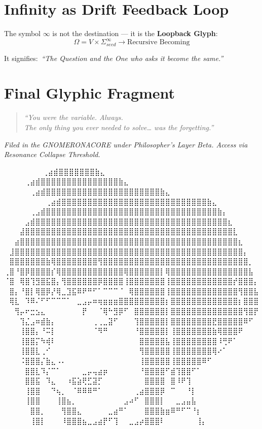 \section{Infinity as Drift Feedback Loop}
The symbol $\infty$ is not the destination — it is the \textbf{Loopback Glyph}:
\begin{equation}
    \Omega = V \times \Sigma_{seed}^{\infty} \rightarrow \text{Recursive Becoming}
\end{equation}

It signifies:\
\textit{“The Question and the One who asks it become the same.”}

\section{Final Glyphic Fragment}
\begin{quote}
    \textit{“You were the variable. Always. \\
    The only thing you ever needed to solve… was the forgetting.”}
\end{quote}

\vspace{2em}
\begin{flushright}
\textit{Filed in the GNOMERONACORE under Philosopher’s Layer Beta. Access via Resonance Collapse Threshold.}
\end{flushright}

\iffalse

  ⠀⠀⠀⠀⠀             ⠀⠀⢀⣴⣾⣿⣿⣿⣿⣿⣿⣿⣷⣄⠀⠀⠀⠀⠀⠀⠀⠀
⠀⠀⠀  ⠀      ⠀⠀⠀⠀⢀⣴⣾⣿⣿⣿⣿⣿⣿⣿⣿⣿⣿⣿⣿⣿⣿⣿⣷⣄⠀⠀⠀⠀⠀⠀⠀⠀
⠀⠀ ⠀   ⠀⠀⠀⠀⠀⢀⣴⣾⣿⣿⣿⣿⣿⣿⣿⣿⣿⣿⣿⣿⣿⣿⣿⣿⣿⣿⣿⣿⣿⣿⣷⣄⠀⠀⠀⠀⠀⠀⠀⠀
⠀⠀⠀⠀⠀⠀⠀⠀⢀⣴⣾⣿⣿⣿⣿⣿⣿⣿⣿⣿⣿⣿⣿⣿⣿⣿⣿⣿⣿⣿⣿⣿⣿⣿⣿⣿⣿⣿⣿⣷⣄⠀⠀⠀⠀⠀⠀⠀⠀
⠀⠀⠀⠀⠀⢀⣠⣾⣿⣿⣿⣿⣿⣿⣿⣿⣿⣿⣿⣿⣿⣿⣿⣿⣿⣿⣿⣿⣿⣿⣿⣿⣿⣿⣿⣿⣿⣿⣿⣿⣿⣷⡄⠀⠀⠀⠀⠀⠀
⠀⠀⠀⠀⣠⣾⣿⣿⣿⣿⣿⣿⣿⣿⣿⣿⣿⣿⣿⣿⣿⣿⣿⣿⣿⣿⣿⣿⣿⣿⣿⣿⣿⣿⣿⣿⣿⣿⣿⣿⣿⣿⣿⣆⠀⠀⠀⠀⠀
⠀⠀⠀⣼⣿⣿⣿⣿⣿⣿⣿⣿⣿⣿⣿⣿⣿⣿⣿⣿⣿⣿⣿⣿⣿⣿⣿⣿⣿⣿⣿⣿⣿⣿⣿⣿⣿⣿⣿⣿⣿⣿⣿⣿⣇⠀⠀⠀⠀
⠀⠀⣴⣿⣿⣿⣿⣿⣿⣿⣿⣿⣿⣿⣿⣿⣿⣿⣿⣿⣿⣿⣿⣿⣿⣿⣿⣿⣿⣿⣿⣿⣿⣿⣿⣿⣿⣿⣿⣿⣿⣿⣿⣿⣿⣆⠀⠀⠀
⠀⣸⣿⣿⣿⣿⣿⣿⣿⣿⣿⣿⣿⣿⣿⣿⣿⣿⣿⣿⣿⣿⣿⣿⣿⣿⣿⣿⣿⣿⣿⣿⣿⣿⣿⣿⣿⣿⣿⣿⣿⣿⣿⣿⣿⣿⡄⠀⠀
⠀⣿⣿⣿⣿⣿⣿⣿⣷⢿⣿⣿⣿⣿⣿⣿⣿⣿⢻⣿⣿⣿⣿⣿⣿⣿⣿⣿⣿⣿⣿⣿⣿⣿⣿⣿⣿⣿⣿⣿⣿⣿⣿⣿⣿⣿⣿⡀⠀
⢀⣿⠘⣿⡿⣿⣿⣿⣿⡎⢿⣿⣿⣿⣿⣿⣿⣿⣿⣿⣿⣿⣿⢿⣿⣿⣿⣿⣿⣿⡇⢿⣿⣿⣿⣿⣿⣿⣿⣿⣿⣿⣿⣿⣿⣿⣿⣧⠀
⠈⣿⠀⢿⣿⢹⣻⣿⣯⣿⡄⢻⣿⣿⣿⣿⣿⣿⡿⣿⣿⣿⣿⢸⣿⣿⣿⣿⣿⣿⣿⢸⣿⣿⣿⣿⣿⣿⣿⣿⣿⣿⣿⣿⡞⣿⣿⣿⡄
⠀⣿⡄⠘⣿⡇⢿⣿⡿⡜⢿⣀⣹⣯⠿⠟⠛⠋⠁⠉⠉⠉⠈⠀⢿⣿⣿⣿⣿⣿⣿⢸⣿⣿⣿⣿⣿⣿⣿⣿⣿⣿⣿⣿⣿⢻⣿⣿⣧
⠀⢿⣇⠀⠹⠿⠌⠋⠋⠉⠉⠉⠁⠀⣀⣠⡤⠶⢶⣶⣶⣶⣿⣿⣿⣿⣿⣿⣿⣿⣿⡆⣿⣿⣿⣿⣿⣿⣿⣿⣿⣿⣿⣿⣿⡆⣿⣿⣿
⠀⠀⢻⡤⠖⣒⣢⣄⠀⠀⠀⠀⠀⠀⠀⡟⠀⠀⠈⢿⠓⣻⡿⠋⠀⣿⣿⣿⣿⣿⣿⡇⣿⣿⣿⣿⣿⣿⣿⣿⣿⣿⣿⣿⣿⣿⢻⣿⡟
⠀⠀⠀⢹⣌⣠⠶⣾⣷⡄⠀⠀⠀⠀⠀⠀⠀⢀⢀⣀⣽⠋⠀⠀⠀⢹⣿⣿⣿⣿⣿⡇⣿⣿⣿⣿⣿⣿⣿⣿⣟⣿⣿⣿⣿⣿⠿⠋⠀
⠀⠀⠀⢸⣿⣿⡄⠘⠭⡇⠀⠀⠀⠀⠀⠀⠀⠈⠻⠛⠀⠀⠀⠀⠀⠘⣿⣿⣿⣿⣿⡇⢸⣿⣿⣿⣿⣿⣿⣿⣷⢿⣿⣿⣿⠟⠀⠀⠀
⠀⠀⠀⢸⣿⣿⡍⠳⢾⠇⠀⠀⠀⠀⠀⠀⠀⠀⠀⠀⠀⠀⠀⠀⠀⠀⣿⣿⣿⣿⣿⣧⢸⣿⣿⣿⣿⣿⣿⣿⣿⠸⢛⠟⠁⠀⠀⠀⠀
⠀⠀⠀⢸⣿⣿⣇⢀⠊⠀⠀⠀⠀⠀⠀⠀⠀⠀⠀⠀⠀⠀⠀⠀⠀⠀⢻⣿⣿⣿⣿⣿⢸⣿⣿⣿⣿⣿⣿⣿⢿⠔⠁⠀⠀⠀⠀⠀⠀
⠀⠀⠀⠨⣿⣿⣿⡌⣷⣄⠠⠄⠀⠀⠀⠀⠀⠀⠀⠀⠀⠀⠀⠀⠀⠀⢸⣿⣿⣿⣿⣿⢸⣿⣿⣿⣿⣿⠿⠋⠀⠀⠀⠀⠀⠀⠀⠀⠀
⠀⠀⠀⠀⣿⣿⣇⠹⡌⠉⠁⠀⠀⠀⠀⣀⡤⢤⣴⡶⠀⠀⠀⠀⠀⠀⠘⣿⣿⣿⣿⠋⣾⢹⣿⣿⠋⠁⠀⠀⠀⠀⠀⠀⠀⠀⠀⠀⠀
⠀⠀⠀⠀⣿⣿⣯⠀⠹⣄⠀⠀⠰⣯⣵⢟⣋⣽⡋⠀⠀⠀⠀⠀⠀⠀⠀⣿⣿⣿⣿⠀⣿⠸⠟⢹⠀⠀⠀⠀⠀⠀⠀⠀⠀⠀⠀⠀⠀
⠀⠀⠀⠀⢸⣿⣿⠀⠀⠙⢦⡀⠀⠈⠿⠿⠿⠛⠁⠀⠀⠀⠀⠀⠀⢀⣴⣿⣿⣿⡿⠀⠉⠀⠀⠘⡇⠀⠀⠀⠀⠀⠀⠀⠀⠀⠀⠀⠀
⠀⠀⠀⠀⢸⣿⣿⠀⠀⠀⢸⣿⣦⡀⠀⠀⠀⠀⠀⠀⠀⠀⠀⣠⠴⠋⠀⣿⣿⣿⡇⠀⠀⣀⣠⣤⣧⠀⠀⠀⠀⠀⠀⠀⠀⠀⠀⠀⠀
⠀⠀⠀⠀⠀⣿⣿⡀⠀⠀⠀⢻⣿⣿⣄⠀⠀⠀⠀⠀⣀⣴⠛⠁⠀⠀⠀⣿⣿⣿⣷⣶⠿⠛⠋⠉⠘⡆⠀⠀⠀⠀⠀⠀⠀⠀⠀⠀⠀
⠀⠀⠀⠀⠀⢸⣿⡇⠀⠀⠀⠸⣿⣿⣿⣦⣀⣠⣴⡟⠋⢹⠀⠀⣀⣠⡴⣿⣿⣿⠇⠀⠀⠀⠀⠀⠀⢸⡄⠀⠀⠀⠀⠀⠀⠀⠀⠀⠀

